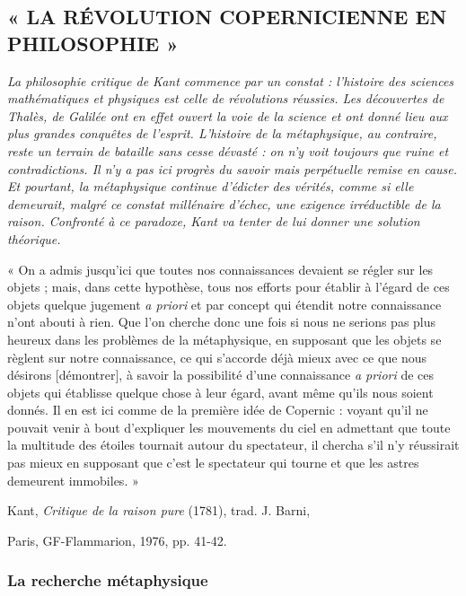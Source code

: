 
\subsection{« LA RÉVOLUTION COPERNICIENNE EN PHILOSOPHIE »}


{\it La philosophie critique de Kant commence par un constat : l'histoire des sciences
mathématiques et physiques est celle de révolutions réussies. Les découvertes de
Thalès, de Galilée ont en effet ouvert la voie de la science et ont donné lieu aux plus
grandes conquêtes de l'esprit. L'histoire de la métaphysique, au contraire, reste un
terrain de bataille sans cesse dévasté : on n’y voit toujours que ruine et
contradictions. Il n’y a pas ici progrès du savoir mais perpétuelle remise en cause.
Et pourtant, la métaphysique continue d’édicter des vérités, comme si elle
demeurait, malgré ce constat millénaire d'échec, une exigence irréductible de la
raison. Confronté à ce paradoxe, Kant va tenter de lui donner une solution
théorique.}

« On a admis jusqu'ici que toutes nos connaissances devaient se régler sur les
objets ; mais, dans cette hypothèse, tous nos efforts pour établir à l'égard de ces
objets quelque jugement {\it a priori} et par concept qui étendit notre connaissance
n’ont abouti à rien. Que l’on cherche donc une fois si nous ne serions pas plus heureux
dans les problèmes de la métaphysique, en supposant que les objets se règlent
sur notre connaissance, ce qui s'accorde déjà mieux avec ce que nous désirons
[démontrer], à savoir la possibilité d’une connaissance {\it a priori} de ces objets qui
établisse quelque chose à leur égard, avant même qu'ils nous soient donnés. Il en
est ici comme de la première idée de Copernic : voyant qu'il ne pouvait venir à
bout d'expliquer les mouvements du ciel en admettant que toute la multitude des
étoiles tournait autour du spectateur, il chercha s’il n’y réussirait pas mieux en supposant
que c’est le spectateur qui tourne et que les astres demeurent immobiles. »

\begin{flushright}
Kant, {\it Critique de la raison pure} (1781), trad. J. Barni,

Paris, GF-Flammarion, 1976, pp. 41-42.
\end{flushright}

\subsubsection{La recherche métaphysique}



